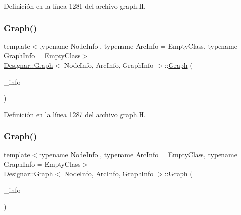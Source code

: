 Definición en la línea 1281 del archivo graph.\+H.

\mbox{\label{class_designar_1_1_graph_a61f5be7345295aa375f3a329ded36c17}} 
\subsubsection{\texorpdfstring{Graph()}{Graph()}\hspace{0.1cm}{\footnotesize\ttfamily [2/5]}}
{\footnotesize\ttfamily template$<$typename Node\+Info , typename Arc\+Info  = Empty\+Class, typename Graph\+Info  = Empty\+Class$>$ \\
\hyperlink{class_designar_1_1_graph}{Designar\+::\+Graph}$<$ Node\+Info, Arc\+Info, Graph\+Info $>$\+::\hyperlink{class_designar_1_1_graph}{Graph} (\begin{DoxyParamCaption}\item[{const Graph\+Info \&}]{\+\_\+info }\end{DoxyParamCaption})\hspace{0.3cm}{\ttfamily [inline]}}



Definición en la línea 1287 del archivo graph.\+H.

\mbox{\label{class_designar_1_1_graph_a14f42f1511cc6e9edf7f54f656febf1e}} 
\subsubsection{\texorpdfstring{Graph()}{Graph()}\hspace{0.1cm}{\footnotesize\ttfamily [3/5]}}
{\footnotesize\ttfamily template$<$typename Node\+Info , typename Arc\+Info  = Empty\+Class, typename Graph\+Info  = Empty\+Class$>$ \\
\hyperlink{class_designar_1_1_graph}{Designar\+::\+Graph}$<$ Node\+Info, Arc\+Info, Graph\+Info $>$\+::\hyperlink{class_designar_1_1_graph}{Graph} (\begin{DoxyParamCaption}\item[{Graph\+Info \&\&}]{\+\_\+info }\end{DoxyParamCaption})\hspace{0.3cm}{\ttfamily [inline]}}



